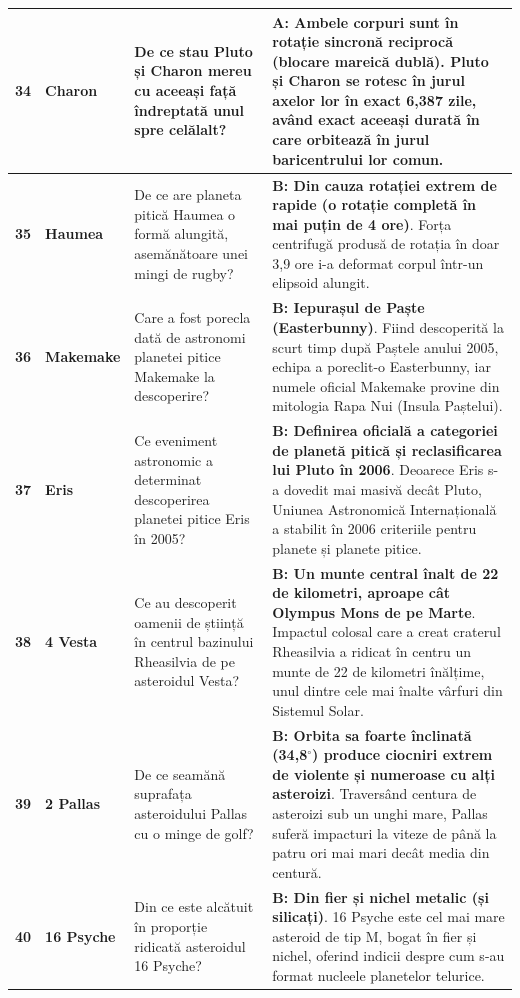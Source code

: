 \begin{longtable}{@{}r >{\raggedright\arraybackslash}p{2.7cm} >{\raggedright\arraybackslash}p{4.8cm} >{\raggedright\arraybackslash}p{6.5cm}@{}}
\textbf{34} & \textbf{Charon} & De ce stau Pluto și Charon mereu cu aceeași față îndreptată unul spre celălalt? & \textbf{A: Ambele corpuri sunt în rotație sincronă reciprocă (blocare mareică dublă)}. {\footnotesize Pluto și Charon se rotesc în jurul axelor lor în exact 6,387 zile, având exact aceeași durată în care orbitează în jurul baricentrului lor comun.} \\ \midrule
\textbf{35} & \textbf{Haumea} & De ce are planeta pitică Haumea o formă alungită, asemănătoare unei mingi de rugby? & \textbf{B: Din cauza rotației extrem de rapide (o rotație completă în mai puțin de 4 ore)}. {\footnotesize Forța centrifugă produsă de rotația în doar 3,9 ore i-a deformat corpul într-un elipsoid alungit.} \\ \midrule
\textbf{36} & \textbf{Makemake} & Care a fost porecla dată de astronomi planetei pitice Makemake la descoperire? & \textbf{B: Iepurașul de Paște (Easterbunny)}. {\footnotesize Fiind descoperită la scurt timp după Paștele anului 2005, echipa a poreclit-o \guillemotleft{}Easterbunny\guillemotright{}, iar numele oficial Makemake provine din mitologia Rapa Nui (Insula Paștelui).} \\ \midrule
\textbf{37} & \textbf{Eris} & Ce eveniment astronomic a determinat descoperirea planetei pitice Eris în 2005? & \textbf{B: Definirea oficială a categoriei de \guillemotleft{}planetă pitică\guillemotright{} și reclasificarea lui Pluto în 2006}. {\footnotesize Deoarece Eris s-a dovedit mai masivă decât Pluto, Uniunea Astronomică Internațională a stabilit în 2006 criteriile pentru planete și planete pitice.} \\ \midrule
\textbf{38} & \textbf{4 Vesta} & Ce au descoperit oamenii de știință în centrul bazinului Rheasilvia de pe asteroidul Vesta? & \textbf{B: Un munte central înalt de 22 de kilometri, aproape cât Olympus Mons de pe Marte}. {\footnotesize Impactul colosal care a creat craterul Rheasilvia a ridicat în centru un munte de 22 de kilometri înălțime, unul dintre cele mai înalte vârfuri din Sistemul Solar.} \\ \midrule
\textbf{39} & \textbf{2 Pallas} & De ce seamănă suprafața asteroidului Pallas cu o minge de golf? & \textbf{B: Orbita sa foarte înclinată (34,8$^\circ$) produce ciocniri extrem de violente și numeroase cu alți asteroizi}. {\footnotesize Traversând centura de asteroizi sub un unghi mare, Pallas suferă impacturi la viteze de până la patru ori mai mari decât media din centură.} \\ \midrule
\textbf{40} & \textbf{16 Psyche} & Din ce este alcătuit în proporție ridicată asteroidul 16 Psyche? & \textbf{B: Din fier și nichel metalic (și silicați)}. {\footnotesize 16 Psyche este cel mai mare asteroid de tip M, bogat în fier și nichel, oferind indicii despre cum s-au format nucleele planetelor telurice.} \\ \midrule

\end{longtable}
